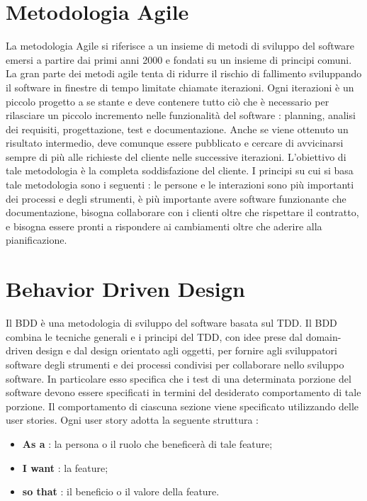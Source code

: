 \documentclass[12pt]{report}
\begin{document}
\section{Metodologia Agile}
La metodologia Agile si riferisce a un insieme di metodi di sviluppo del software emersi a partire dai primi anni 2000 e fondati su un insieme di principi comuni. La gran parte dei metodi agile tenta di ridurre il rischio di fallimento sviluppando il software in finestre di tempo limitate chiamate iterazioni. Ogni iterazioni è un piccolo progetto a se stante e deve contenere tutto ciò che è necessario per rilasciare un piccolo incremento nelle funzionalità del software : planning, analisi dei requisiti, progettazione, test e documentazione. Anche se viene ottenuto un risultato intermedio, deve comunque essere pubblicato e cercare di avvicinarsi sempre di più alle richieste del cliente nelle successive iterazioni. L'obiettivo di tale metodologia è la completa soddisfazione del cliente. I principi su cui si basa tale metodologia sono i seguenti : le persone e le interazioni sono più importanti dei processi e degli strumenti, è più importante avere software funzionante che documentazione, bisogna collaborare con i clienti oltre che rispettare il contratto, e bisogna essere pronti a rispondere ai cambiamenti oltre che aderire alla pianificazione.
\section{Behavior Driven Design}
Il BDD è una metodologia di sviluppo del software basata sul TDD. Il BDD combina le tecniche generali e i principi del TDD, con idee prese dal domain-driven design e dal design orientato agli oggetti, per fornire agli sviluppatori software degli strumenti e dei processi condivisi per collaborare nello sviluppo software. In particolare esso specifica che i test di una determinata porzione del software devono essere specificati in termini del desiderato comportamento di tale porzione. Il comportamento di ciascuna sezione viene specificato utilizzando delle user stories. Ogni user story adotta la seguente struttura :
\begin{itemize}
\item \textbf{As a} : la persona o il ruolo che beneficerà di tale feature;
\item \textbf{I want} : la feature;
\item \textbf{so that} : il beneficio o il valore della feature.
\end{itemize}
\end{document}
